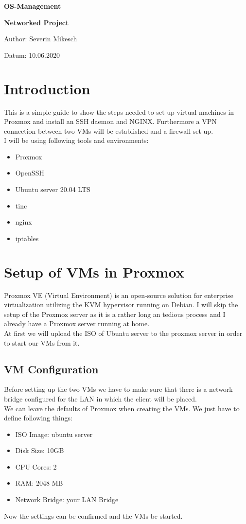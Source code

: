 \documentclass[10pt,a4paper]{article}
\begin{document}
\huge
\begin{center}
{\bf OS-Management}\par
{\bf Networked Project}\par
\vspace{5cm}
\end{center}

\large
Author: Severin Mikesch\par
\vspace{0.8cm}
Datum: 10.06.2020\par
\vspace{0.8cm}

\normalsize


\newpage
\section{Introduction}
This is a simple guide to show the steps needed to set up virtual machines in Proxmox and install an SSH daemon and NGINX. Furthermore a VPN connection between two VMs will be established and a firewall set up.
\\
I will be using following tools and environments:
\begin{itemize}
\item Proxmox
\item OpenSSH
\item Ubuntu server 20.04 LTS
\item tinc
\item nginx
\item iptables
\end{itemize}

\newpage
\section{Setup of VMs in Proxmox}
Proxmox VE (Virtual Environment) is an open-source solution for enterprise virtualization utilizing the KVM hypervisor running on Debian. I will skip the setup of the Proxmox server as it is a rather long an tedious process and I already have a Proxmox server running at home.
\\
At first we will upload the ISO of Ubuntu server to the proxmox server in order to start our VMs from it.

\subsection{VM Configuration}
Before setting up the two VMs we have to make sure that there is a network bridge configured for the LAN in which the client will be placed.
\\
We can leave the defaults of Proxmox when creating the VMs. We just have to define following things:
\begin{itemize}
\item ISO Image: ubuntu server
\item Disk Size: 10GB
\item CPU Cores: 2
\item RAM: 2048 MB
\item Network Bridge: your LAN Bridge
\end{itemize}
Now the settings can be confirmed and the VMs be started.
\end{document}
